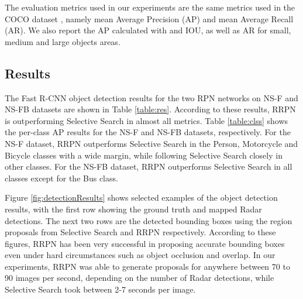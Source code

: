 \documentclass{article}
\newcommand{\datasetF}{NS-F }
\newcommand{\datasetFB}{NS-FB }
\begin{document}
The evaluation metrics used in our experiments are the same metrics used in 
the COCO dataset \cite{Lin_2014}, namely 
mean Average Precision (AP) and mean Average Recall (AR). 
We also report the AP calculated 
with  and  IOU, as well as AR for small, medium and large objects areas.
\subsection{Results}
The Fast R-CNN object detection results for the two RPN networks on \datasetF and 
\datasetFB datasets are shown in Table \ref{table:res}. 
According to these results, RRPN is outperforming Selective Search in almost all metrics.
Table \ref{table:clss} shows the per-class AP results for the 
\datasetF and \datasetFB datasets, respectively. For the \datasetF dataset, RRPN outperforms 
Selective Search in the Person, Motorcycle and Bicycle classes with a wide margin, while 
following Selective Search closely in other classes. For the \datasetFB dataset, RRPN 
outperforms Selective Search in all classes except for the Bus class.

Figure \ref{fig:detectionResults} shows selected examples of the object detection results, with the first row showing the ground truth and mapped Radar detections. The next two rows are the detected bounding boxes using the region proposals from 
Selective Search and RRPN respectively. According to these figures, RRPN has been very 
successful in proposing accurate bounding boxes even under hard circumstances such as 
object occlusion and overlap.
In our experiments, RRPN was able to generate proposals for anywhere between 70 to 90 
images per second, depending on the number of Radar detections, while Selective Search took between 2-7 seconds per image.
\end{document}
